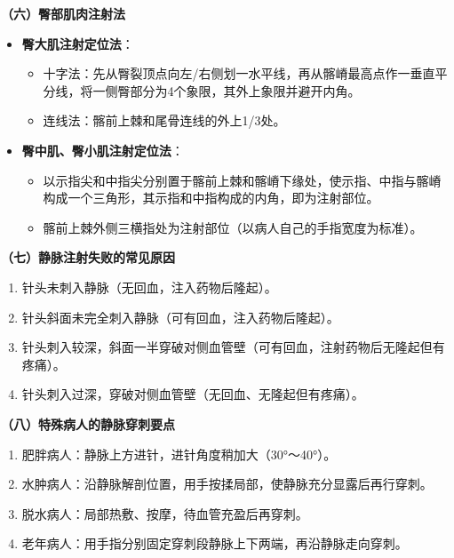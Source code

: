 \documentclass[11pt, a4paper]{ctexart}
\begin{document}
\textbf{（六）臀部肌肉注射法}
\begin{itemize}
    \item \textbf{臀大肌注射定位法}：
    \begin{itemize}
        \item 十字法：先从臀裂顶点向左/右侧划一水平线，再从髂嵴最高点作一垂直平分线，将一侧臀部分为4个象限，其外上象限并避开内角。
        \item 连线法：髂前上棘和尾骨连线的外上1/3处。
    \end{itemize}
    \item \textbf{臀中肌、臀小肌注射定位法}：
    \begin{itemize}
        \item 以示指尖和中指尖分别置于髂前上棘和髂嵴下缘处，使示指、中指与髂嵴构成一个三角形，其示指和中指构成的内角，即为注射部位。
        \item 髂前上棘外侧三横指处为注射部位（以病人自己的手指宽度为标准）。
    \end{itemize}
\end{itemize}

\textbf{（七）静脉注射失败的常见原因}
\begin{enumerate}
    \item 针头未刺入静脉（无回血，注入药物后隆起）。
    \item 针头斜面未完全刺入静脉（可有回血，注入药物后隆起）。
    \item 针头刺入较深，斜面一半穿破对侧血管壁（可有回血，注射药物后无隆起但有疼痛）。
    \item 针头刺入过深，穿破对侧血管壁（无回血、无隆起但有疼痛）。
\end{enumerate}

\textbf{（八）特殊病人的静脉穿刺要点}
\begin{enumerate}
    \item 肥胖病人：静脉上方进针，进针角度稍加大（30°～40°）。
    \item 水肿病人：沿静脉解剖位置，用手按揉局部，使静脉充分显露后再行穿刺。
    \item 脱水病人：局部热敷、按摩，待血管充盈后再穿刺。
    \item 老年病人：用手指分别固定穿刺段静脉上下两端，再沿静脉走向穿刺。
\end{enumerate}
\end{document}
